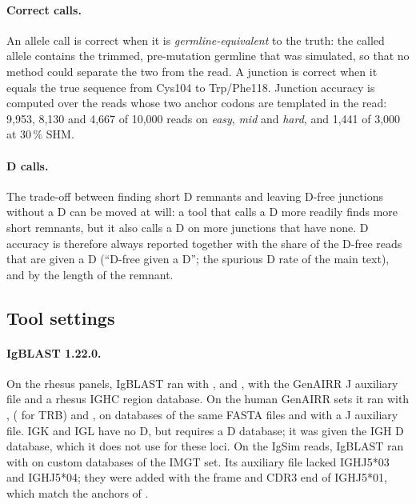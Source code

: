 \documentclass[11pt,a4paper]{article}
\begin{document}
\paragraph{Correct calls.} An allele call is correct when it is
\emph{germline-equivalent} to the truth: the called allele contains the
trimmed, pre-mutation germline that was simulated, so that no method could
separate the two from the read. A junction is correct when it equals the
true sequence from Cys104 to Trp/Phe118. Junction accuracy is computed over
the reads whose two anchor codons are templated in the read: 9,953, 8,130
and 4,667 of 10,000 reads on \emph{easy}, \emph{mid} and \emph{hard}, and
1,441 of 3,000 at 30\,\% SHM.

\paragraph{D calls.} The trade-off between finding short D remnants and
leaving D-free junctions without a D can be moved at will: a tool that calls
a D more readily finds more short remnants, but it also calls a D on more
junctions that have none. D accuracy is therefore always reported together
with the share of the D-free reads that are given a D (``D-free given a D'';
the spurious D rate of the main text), and by the length of the remnant.

\subsection{Tool settings}
\label{sec:protocol-tools}

\paragraph{IgBLAST 1.22.0.} On the rhesus panels, IgBLAST ran with
,  and
, with the GenAIRR J auxiliary file and a rhesus IGHC
region database. On the human GenAIRR sets it ran with
,  ( for TRB) and
, on  databases of the same FASTA files
and with a J auxiliary file. IGK and IGL have no D, but 
requires a D database; it was given the IGH D database, which it does not
use for these loci. On the IgSim reads, IgBLAST ran with
 on custom databases of the IMGT set. Its auxiliary
file lacked IGHJ5*03 and IGHJ5*04; they were added with the frame and CDR3
end of IGHJ5*01, which match the anchors of \swig.
\end{document}
